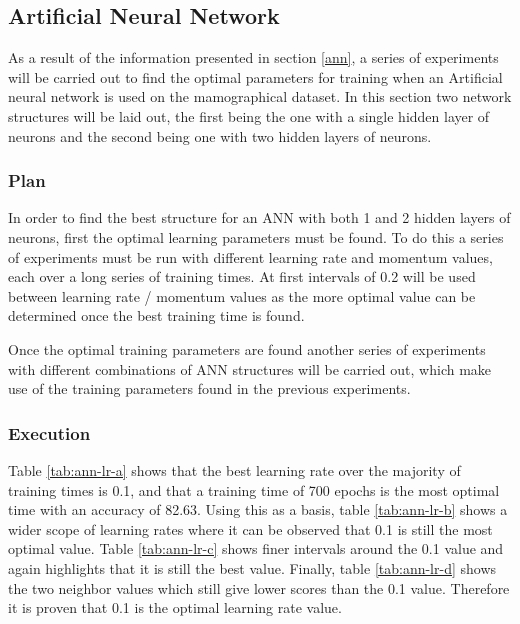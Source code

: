 \documentclass[12pt]{article}
\begin{document}
  \newpage

  \subsection{Artificial Neural Network}
    As a result of the information presented in section \ref{ann}, a series of experiments will be carried out to find the optimal parameters for training when an Artificial neural network is used on the mamographical dataset. In this section two network structures will be laid out, the first being the one with a single hidden layer of neurons and the second being one with two hidden layers of neurons.

    \subsubsection{Plan}
      In order to find the best structure for an ANN with both 1 and 2 hidden layers of neurons, first the optimal learning parameters must be found. To do this a series of experiments must be run with different learning rate and momentum values, each over a long series of training times. At first intervals of 0.2 will be used between learning rate / momentum values as the more optimal value can be determined once the best training time is found.

      Once the optimal training parameters are found another series of experiments with different combinations of ANN structures will be carried out, which make use of the training parameters found in the previous experiments.

    \subsubsection{Execution}
      Table \ref{tab:ann-lr-a} shows that the best learning rate over the majority of training times is 0.1, and that a training time of 700 epochs is the most optimal time with an accuracy of 82.63. Using this as a basis, table \ref{tab:ann-lr-b} shows a wider scope of learning rates where it can be observed that 0.1 is still the most optimal value. Table \ref{tab:ann-lr-c} shows finer intervals around the 0.1 value and again highlights that it is still the best value. Finally, table \ref{tab:ann-lr-d} shows the two neighbor values which still give lower scores than the 0.1 value. Therefore it is proven that 0.1 is the optimal learning rate value.
\end{document}
